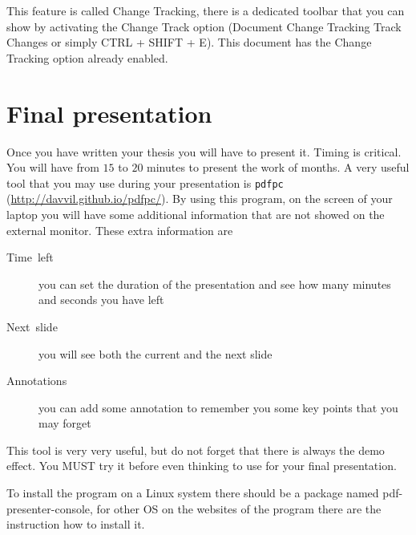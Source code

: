 This feature is called \textsf{Change Tracking}, there is a dedicated
toolbar that you can show by activating the \textsf{Change Track}
option (\textsf{Document \lyxarrow{} Change Tracking \lyxarrow{} Track
Changes} or simply \textsf{CTRL + SHIFT + E}). This document has the
\textsf{Change Tracking} option already enabled.

\section{Final presentation}

Once you have written your thesis you will have to present it. Timing
is critical. You will have from $15$ to $20$ minutes to present
the work of months. A very useful tool that you may use during your
presentation is \texttt{pdfpc} (\url{http://davvil.github.io/pdfpc/}).
By using this program, on the screen of your laptop you will have
some additional information that are not showed on the external monitor.
These extra information are
\begin{description}
\item [{Time~left}] you can set the duration of the presentation and see
how many minutes and seconds you have left
\item [{Next~slide}] you will see both the current and the next slide
\item [{Annotations}] you can add some annotation to remember you some
key points that you may forget
\end{description}
This tool is very very useful, but do not forget that there is always
the demo effect. You MUST try it before even thinking to use for your
final presentation.

To install the program on a Linux system there should be a package
named \textsf{pdf-presenter-console}, for other OS on the websites
of the program there are the instruction how to install it.
